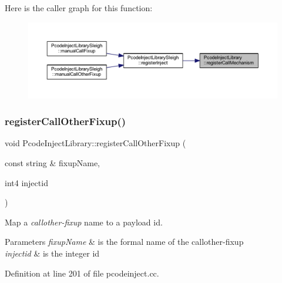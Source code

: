 Here is the caller graph for this function\+:
\nopagebreak
\begin{figure}[H]
\begin{center}
\leavevmode
\includegraphics[width=350pt]{class_pcode_inject_library_a8e767c1d87d0cfabac0341c35c188b88_icgraph}
\end{center}
\end{figure}
\mbox{\label{class_pcode_inject_library_aa06eaa0357d6aeed80a3f64a5e914a53}} 
\subsubsection{\texorpdfstring{registerCallOtherFixup()}{registerCallOtherFixup()}}
{\footnotesize\ttfamily void Pcode\+Inject\+Library\+::register\+Call\+Other\+Fixup (\begin{DoxyParamCaption}\item[{const string \&}]{fixup\+Name,  }\item[{int4}]{injectid }\end{DoxyParamCaption})\hspace{0.3cm}{\ttfamily [protected]}}



Map a {\itshape callother-\/fixup} name to a payload id. 


\begin{DoxyParams}{Parameters}
{\em fixup\+Name} & is the formal name of the callother-\/fixup \\
\hline
{\em injectid} & is the integer id \\
\hline
\end{DoxyParams}


Definition at line 201 of file pcodeinject.\+cc.

